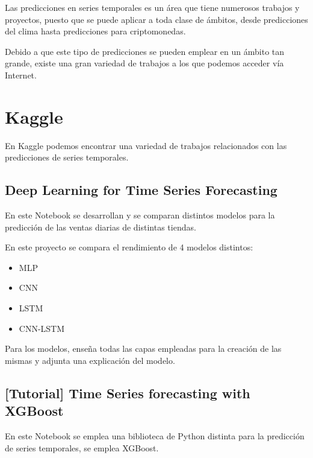 
Las predicciones en series temporales es un área que tiene numerosos trabajos y proyectos, puesto que se puede aplicar a toda clase de ámbitos, desde predicciones del clima hasta predicciones para criptomonedas.

\par

Debido a que este tipo de predicciones se pueden emplear en un ámbito tan grande, existe una gran variedad de trabajos a los que podemos acceder vía Internet.

\section{Kaggle}

En Kaggle podemos encontrar una variedad de trabajos relacionados con las predicciones de series temporales.

\subsection{Deep Learning for Time Series Forecasting}

En este Notebook \cite{kaggle:1} se desarrollan y se comparan distintos modelos para la predicción de las ventas diarias de distintas tiendas.

\par

En este proyecto se compara el rendimiento de 4 modelos distintos:

\begin{itemize}
    \item MLP
    \item CNN
    \item LSTM
    \item CNN-LSTM
\end{itemize}

Para los modelos, enseña todas las capas empleadas para la creación de las mismas y adjunta una explicación del modelo.

\subsection{[Tutorial] Time Series forecasting with XGBoost}

En este Notebook \cite{kaggle:2} se emplea una biblioteca de Python distinta para la predicción de series temporales, se emplea XGBoost.

\par

